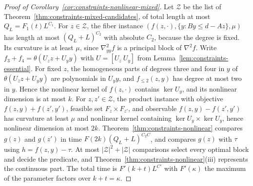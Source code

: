 \begin{proof}[Proof of Corollary~\ref{cor:constraints-nonlinear-mixed}]
Let $\mathcal Z$ be the list of Theorem~\ref{thm:constraints-mixed-candidates},
of total length at most $Q_L=F_1(t)L^{C_1}$. For $z\in\mathcal Z$, the fiber
instance $(f(z,\cdot),\{y:By\le d-Az\},\mu)$ has length at most
$(Q_L+L)^{C_2}$ with absolute $C_2$, because the degree is fixed. Its
curvature is at least $\mu$, since $\nabla^2_{yy}f$ is a principal block of
$\nabla^2f$. Write $f_3+f_4=\theta(U_zz+U_yy)$ with
$U=[U_z\ U_y]$ from Lemma~\ref{lem:constraints-essential}. For fixed $z$, the
homogeneous parts of degrees three and four in $y$ of $\theta(U_zz+U_yy)$ are
polynomials in $U_yy$, and $f_{\le2}(z,y)$ has degree at most two in $y$.
Hence the nonlinear kernel of $f(z,\cdot)$ contains $\ker U_y$, and its
nonlinear dimension is at most $k$. For $z,z'\in\mathcal Z$, the product
instance with objective $f(z,y)+f(z',y')$, feasible set $F_z\times F_{z'}$, and
observable $f(z,y)-f(z',y')$ has curvature at least $\mu$ and nonlinear
kernel containing $\ker U_y\times\ker U_y$, hence nonlinear dimension at most
$2k$. Theorem~\ref{thm:constraints-nonlinear} compares $g(z)$ and $g(z')$ in
time $F(2k)(Q_L+L)^{C_2C}$, and compares $g(z)$ with $\tau$ using
$h=f(z,y)-\tau$. At most $|\mathcal Z|^2+|\mathcal Z|$ comparisons select every
optimal block and decide the predicate, and
Theorem~\ref{thm:constraints-nonlinear}(iii) represents the continuous part.
The total time is $F'(k+t)L^{C'}$ with $F'(\kappa)$ the maximum of the
parameter factors over $k+t=\kappa$.
\end{proof}

